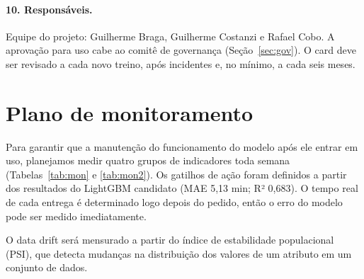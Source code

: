 \documentclass[11pt,a4paper]{article}
\begin{document}
\paragraph{10. Responsáveis.} Equipe do projeto: Guilherme Braga, Guilherme Costanzi e Rafael Cobo. A aprovação para uso cabe ao comitê de governança
(Seção~\ref{sec:gov}). O card deve ser revisado a cada novo treino, após incidentes e, no
mínimo, a cada seis meses.

\section{Plano de monitoramento}
\label{sec:mon}

Para garantir que a manutenção do funcionamento do modelo após ele entrar em uso, planejamos medir
quatro grupos de indicadores toda semana (Tabelas~\ref{tab:mon} e \ref{tab:mon2}). Os gatilhos de ação 
foram definidos a partir dos resultados do LightGBM candidato (MAE 5,13 min; R² 0,683). 
O tempo real de cada entrega é determinado logo depois do pedido, então o erro do modelo pode ser medido imediatamente.

O data drift será mensurado a partir do índice de estabilidade populacional (PSI), que detecta mudanças
na distribuição dos valores de um atributo em um conjunto de dados.
\end{document}
